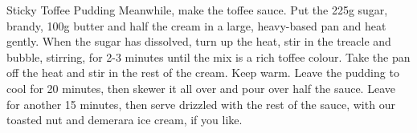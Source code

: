 \begin{recipe}[source=\url{https://www.deliciousmagazine.co.uk/recipes/the-best-sticky-toffee-pudding/},portion={\unit[8]{portions}},preparationtime={\unit[30]{min}},bakingtime={\unit[50]{min}}]{Sticky Toffee Pudding}
{        \step Meanwhile, make the toffee sauce. Put the 225g sugar, brandy, 100g butter and half the cream in a large, heavy-based pan and heat gently. When the sugar has dissolved, turn up the heat, stir in the treacle and bubble, stirring, for 2-3 minutes until the mix is a rich toffee colour. Take the pan off the heat and stir in the rest of the cream. Keep warm.
        \step Leave the pudding to cool for 20 minutes, then skewer it all over and pour over half the sauce. Leave for another 15 minutes, then serve drizzled with the rest of the sauce, with our toasted nut and demerara ice cream, if you like.
}
\end{recipe}

